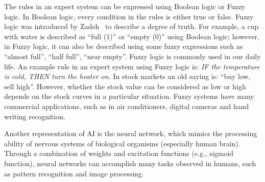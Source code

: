 The rules in an expect system can be expressed using Boolean logic or Fuzzy logic. In Boolean logic, every condition in the rules is either true or false. Fuzzy logic was introduced by Zadeh~\cite{Zadeh:IC:1965} to describe a degree of truth. For example, a cup with water is described as ``full (1)'' or ``empty (0)'' using Boolean logic; however, in Fuzzy logic, it can also be described using some fuzzy expressions such as ``almost full'', ``half full'', ``near empty''. Fuzzy logic is commonly used in our daily life. An example rule in an expert system using Fuzzy logic is: \textit{IF the temperature is cold, THEN turn the heater on.} In stock markets an old saying is: ``buy low, sell high''. However, whether the stock value can be considered as low or high depends on the stock curves in a particular situation. Fuzzy systems have many commercial applications, such as in air conditioners, digital cameras and hand writing recognition. 

Another representation of AI is the neural network, which mimics the processing ability of nervous systems of biological organisms (especially human brain). Through a combination of weights and excitation functions (e.g., sigmoid function), neural networks can accomplish many tasks observed in humans, such as pattern recognition and image processing. 



